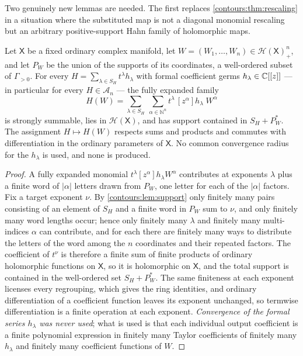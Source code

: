 \documentclass[11pt,letterpaper]{article}
\theoremstyle{definition}
\theoremstyle{remark}
\newcommand{\N}{\mathbb N}\newcommand{\Z}{\mathbb Z}\newcommand{\DD}{\mathbb D}
\newcommand{\HH}{\mathcal H}\newcommand{\A}{\mathscr A}\newcommand{\OO}{\mathcal O}
\numberwithin{equation}{section}
\begin{document}
Two genuinely new lemmas are needed. The first replaces
\cref{contours:thm:rescaling} in a situation where the substituted map is not a
diagonal monomial rescaling but an arbitrary positive-support Hahn family of
holomorphic maps.

\begin{lemma}
\label{contours:lem:radiusfreesub}
Let $\mathsf X$ be a fixed ordinary complex manifold, let
$W=(W_1,\ldots,W_n)\in\HH(\mathsf X)_+^n$, and let $P_W$ be the union of the
supports of its coordinates, a well-ordered subset of $\Gamma_{>0}$. For every
$H=\sum_{\lambda\in S_H}t^\lambda h_\lambda$ with formal coefficient germs
$h_\lambda\in\mathbb C[[z]]$ --- in particular for every $H\in\A_n$ --- the fully
expanded family
\begin{equation}\label{contours:eq:radiusfreesub}
  H(W)=\sum_{\lambda\in S_H}\ \sum_{\alpha\in\N^n}
  t^\lambda\,[z^\alpha]h_\lambda\;W^\alpha
\end{equation}
is strongly summable, lies in $\HH(\mathsf X)$, and has support contained in
$S_H+P_W^*$. The assignment $H\mapsto H(W)$ respects sums and products and
commutes with differentiation in the ordinary parameters of $\mathsf X$. No
common convergence radius for the $h_\lambda$ is used, and none is produced.
\end{lemma}
\begin{proof}
A fully expanded monomial $t^\lambda[z^\alpha]h_\lambda W^\alpha$ contributes at
exponents $\lambda$ plus a finite word of $|\alpha|$ letters drawn from $P_W$,
one letter for each of the $|\alpha|$ factors. Fix a target exponent $\nu$. By
\cref{contours:lem:support} only finitely many pairs consisting of an element of
$S_H$ and a finite word in $P_W$ sum to $\nu$, and only finitely many word
lengths occur; hence only finitely many $\lambda$ and finitely many multi-indices
$\alpha$ can contribute, and for each there are finitely many ways to distribute
the letters of the word among the $n$ coordinates and their repeated factors. The
coefficient of $t^\nu$ is therefore a finite sum of finite products of ordinary
holomorphic functions on $\mathsf X$, so it is holomorphic on $\mathsf X$, and
the total support is contained in the well-ordered set $S_H+P_W^*$. The same
finiteness at each exponent licenses every regrouping, which gives the ring
identities, and ordinary differentiation of a coefficient function leaves its
exponent unchanged, so termwise differentiation is a finite operation at each
exponent. \emph{Convergence of the formal series $h_\lambda$ was never used};
what is used is that each individual output coefficient is a finite polynomial
expression in finitely many Taylor coefficients of finitely many $h_\lambda$ and
finitely many coefficient functions of $W$.
\end{proof}
\end{document}
